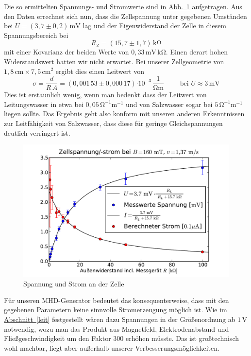 \documentclass[11pt]{scrartcl}
\newcommand{\unit}[1]{\ensuremath{\,\mathrm{#1}}} %
\newcommand{\ee}[1]{\ensuremath{\cdot\! 10^{#1}}}
\newcommand{\abb}[1]{\hyperref[#1]{Abb.~\ref{#1}}}
\begin{document}
Die so ermittelten Spannungs- und Stromwerte sind in \abb{fig:strom} aufgetragen.
Aus den Daten errechnet sich nun, dass die Zellspannung unter gegebenen Umständen bei $U = (3,7 \pm 0,2)\unit{mV}$ lag und der Eigenwiderstand der Zelle in diesem Spannungsbereich bei
\begin{equation}
R_{\text{Z}} = (15,7 \pm 1,7)\unit{k\Omega}
\end{equation}
mit einer Kovarianz der beiden Werte von $0,33\unit{mV}\unit{k\Omega}$.
Einen derart hohen Widerstandswert hatten wir nicht erwartet.
Bei unserer Zellgeometrie von $1,8\unit{cm}\times 7,5\unit{cm^2}$ ergibt dies einen Leitwert von
\begin{equation}
\sigma
= \frac{d}{R\,A}
= (0,001\,53 \pm 0,000\,17)\ee{-3}\unit{\frac{1}{\Omega m}}
\qquad
\text{ bei } U\approx 3\unit{mV}
\label{eqn:sigma}
\end{equation}
Dies ist erstaunlich wenig, wenn man bedenkt dass der Leitwert von Leitungswasser in etwa bei $0,05\unit{\Omega^{-1}m^{-1}}$ und von Salzwasser sogar bei $5\unit{\Omega^{-1}m^{-1}}$ liegen sollte.
Das Ergebnis geht also konform mit unseren anderen Erkenntnissen zur Leitfähigkeit von Salzwasser, dass diese für geringe Gleichspannungen deutlich verringert ist.

\begin{figure}[H]
\begin{center}
\includegraphics[width=1.0\textwidth]{images/strom.pdf}
\end{center}
\vspace{-1.5\baselineskip}
\caption{Spannung und Strom an der Zelle}
\label{fig:strom}
\end{figure}

Für unseren MHD-Generator bedeutet das konsequenterweise, dass mit den gegebenen Parametern keine sinnvolle Stromerzeugung möglich ist. Wie im \hyperref[leit]{Abschnitt~\ref{leit}} festgestellt wären dazu Spannungen in der Größenordnung ab $1\unit{V}$ notwendig, wozu man das Produkt aus Magnetfeld, Elektrodenabstand und Fließgeschwindigkeit um den Faktor 300 erhöhen müsste. Das ist großtechnisch wohl machbar, liegt aber außerhalb unserer Verbesserungsmöglichkeiten.
\end{document}
